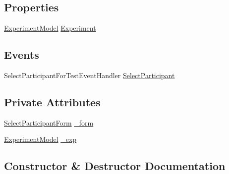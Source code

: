 \subsection*{Properties}
\begin{DoxyCompactItemize}
\item 
\hyperlink{class_web_analyzer_1_1_models_1_1_base_1_1_experiment_model}{Experiment\+Model} \hyperlink{class_web_analyzer_1_1_u_i_1_1_interaction_objects_1_1_select_participant_control_a2676543013c6706859d21701a8f78000}{Experiment}
\end{DoxyCompactItemize}
\subsection*{Events}
\begin{DoxyCompactItemize}
\item 
Select\+Participant\+For\+Test\+Event\+Handler \hyperlink{class_web_analyzer_1_1_u_i_1_1_interaction_objects_1_1_select_participant_control_aed961b133694321fc9ba8bf431ade028}{Select\+Participant}
\end{DoxyCompactItemize}
\subsection*{Private Attributes}
\begin{DoxyCompactItemize}
\item 
\hyperlink{class_web_analyzer_1_1_u_i_1_1_select_participant_form}{Select\+Participant\+Form} \hyperlink{class_web_analyzer_1_1_u_i_1_1_interaction_objects_1_1_select_participant_control_ab50cc6cc34c9fe6cc96b8aff94350c49}{\+\_\+form}
\item 
\hyperlink{class_web_analyzer_1_1_models_1_1_base_1_1_experiment_model}{Experiment\+Model} \hyperlink{class_web_analyzer_1_1_u_i_1_1_interaction_objects_1_1_select_participant_control_ad422fced46a5eb4cf3cff068352e2af5}{\+\_\+exp}
\end{DoxyCompactItemize}


\subsection{Constructor \& Destructor Documentation}
\hypertarget{class_web_analyzer_1_1_u_i_1_1_interaction_objects_1_1_select_participant_control_a5e32876cf2be99557c7c68d2e127448e}{}
